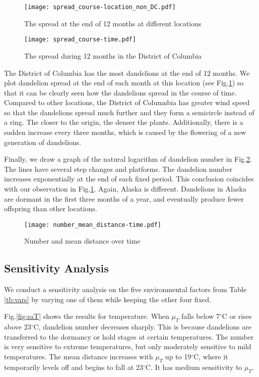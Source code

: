 \documentclass[12pt]{article}
\begin{document}
			\begin{figure}[htbp]
				\centering
				\texttt{[image: spread\_course-location\_non\_DC.pdf]}
				\caption{The spread at the end of 12 months at different locations}
				\label{fig:scatter5loc}
				
				\vspace{1cm}

				\texttt{[image: spread\_course-time.pdf]}
				\caption{The spread during 12 months in the District of Columbia}
				\label{fig:spreadDC}
			\end{figure}
			\newpage
			
			The District of Columbia has the most dandelions at the end of 12 months.  We plot dandelion spread at the end of each month at this location (see Fig.\ref{fig:spreadDC}) so that it can be clearly seen how the dandelions spread in the course of time.  Compared to other locations, the District of Columnbia has greater wind speed so that the dandelions spread much further and they form a semicircle instead of a ring.  The closer to the origin, the denser the plants.  Additionally, there is a sudden increase every three months, which is caused by the flowering of a new generation of dandelions.
			
			Finally, we draw a graph of the natural logarithm of dandelion number in Fig.\ref{fig:time}.  The lines have several step changes and platforms.  The dandelion number increases exponentially at the end of each fixed period.  This conclusion coincides with our observation in Fig.\ref{fig:spreadDC}.  Again, Alaska is different.  Dandelions in Alaska are dormant in the first three months of a year, and eventually produce fewer offspring than other locations.
			
			\begin{figure}[htbp]
				\centering
				\texttt{[image: number\_mean\_distance-time.pdf]}
				\caption{Number and mean distance over time}
				\label{fig:time}
			\end{figure}
		
		
		
		\subsection{Sensitivity Analysis}
			
			We conduct a sensitivity analysis on the five environmental factors from Table \ref{tb:vars} by varying one of them while keeping the other four fixed.  
			
			Fig.\ref{fig:saT} shows the results for temperature.  When $\mu_T$ falls below 7$^\circ$C or rises above 23$^\circ$C, dandelion number decreases sharply.  This is because dandelions are transferred to the dormancy or hold stages at certain temperatures.  The number is very sensitive to extreme temperatures, but only moderately sensitive to mild temperatures.  The mean distance increases with $\mu_T$ up to 19$^\circ$C, where it temporarily levels off and begins to fall at 23$^\circ$C.  It has medium sensitivity to $\mu_T$.
			
\end{document}
